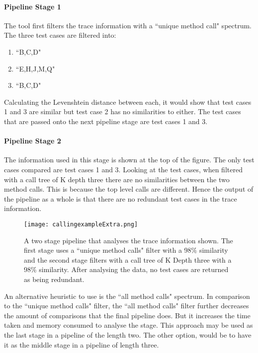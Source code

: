 \paragraph{Pipeline Stage 1}
The tool first filters the trace information with a ``unique method call" spectrum. The three test cases are filtered into:

\begin{enumerate}
\item ``B,C,D" 
\item ``E,H,J,M,Q"
\item ``B,C,D"
\end{enumerate}

Calculating the Levenshtein distance between each, it would show that test cases 1 and 3 are similar but test case 2 has no similarities to either. The test cases that are passed onto the next pipeline stage are test cases 1 and 3.

\paragraph{Pipeline Stage 2}

The information used in this stage is shown at the top of the figure. The only test cases compared are test cases 1 and 3. Looking at the test cases, when filtered with a call tree of K depth three there are no similarities between the two method calls. This is because the top level calls are different. Hence the output of the pipeline as a whole is that there are no redundant test cases in the trace information.

\begin{figure}[h]
\texttt{[image: callingexampleExtra.png]}
\caption[An example of a pipeline with the settings and trace information]{A two stage pipeline that analyses the trace information shown. The first stage uses a ``unique method calls" filter with a 98\% similarity and the second stage filters with a call tree of K Depth three with a 98\% similarity. After analysing the data, no test cases are returned as being redundant.}
\label{fig:pipelineExample}
\end{figure}

An alternative heuristic to use is the ``all method calls" spectrum. In comparison to the ``unique method calls" filter, the ``all method calls" filter further decreases the amount of comparisons that the final pipeline does. But it increases the time taken and memory consumed to analyse the stage. This approach may be used as the last stage in a pipeline of the length two. The other option, would be to have it as the middle stage in a pipeline of length three.

